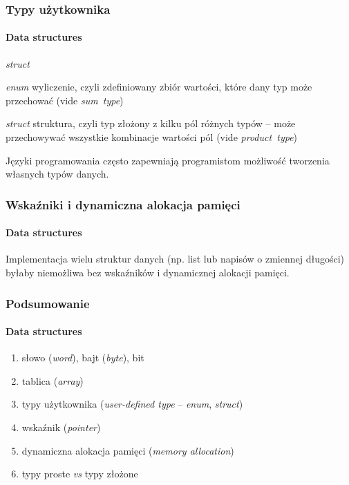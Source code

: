 \documentclass[aspectratio=169]{beamer}
\begin{document}
\begin{frame}
    \frametitle{Typy użytkownika}
    \framesubtitle{Data structures}

    \begin{labeling}{\emph{struct}}
        \item[\emph{enum}] wyliczenie, czyli zdefiniowany zbiór wartości, które
            dany typ może przechować (vide \emph{sum~type})
        \item[\emph{struct}] struktura, czyli typ złożony z kilku pól różnych
                typów -- może przechowywać wszystkie kombinacje wartości pól
                (vide \emph{product~type})
    \end{labeling}

    Języki programowania często zapewniają programistom możliwość tworzenia
    własnych typów danych.
\end{frame}

\begin{frame}
    \frametitle{Wskaźniki i dynamiczna alokacja pamięci}
    \framesubtitle{Data structures}

    Implementacja wielu struktur danych (np. list lub napisów o zmiennej
    długości) byłaby niemożliwa bez wskaźników i dynamicznej alokacji pamięci.
\end{frame}

\begin{frame}
    \frametitle{Podsumowanie}
    \framesubtitle{Data structures}

    \begin{enumerate}
        \item słowo (\emph{word}), bajt (\emph{byte}), bit
        \item tablica (\emph{array})
        \item typy użytkownika (\emph{user-defined type} -- \emph{enum},
            \emph{struct})
        \item wskaźnik (\emph{pointer})
        \item dynamiczna alokacja pamięci (\emph{memory allocation})
        \item typy proste \emph{vs} typy złożone
    \end{enumerate}
\end{frame}
\end{document}

